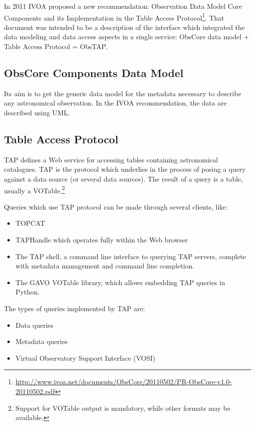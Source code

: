In 2011 IVOA proposed a new recommendation: Observation Data Model Core Components and its Implementation in the Table Access Protocol\footnote{\url{http://www.ivoa.net/documents/ObsCore/20110502/PR-ObsCore-v1.0-20110502.pdf}}. That document was intended to be a description of the interface which integrated the data modeling and data access aspects in a single service: ObsCore data model + Table Access Protocol = ObsTAP.

\subsection{ObsCore Components Data Model}

Its aim is to get the generic data model for the metadata necessary to describe any astronomical observation. In the IVOA recommendation, the data are described using UML.

\subsection{Table Access Protocol}

TAP defines a Web service for accessing tables containing astronomical catalogues. TAP is the protocol which underlies in the process of posing a query against a data source (or several data sources). The result of a query is a table, usually a VOTable.\footnote{Support for VOTable output is mandatory, while other formats may be available.}  

Queries which use TAP protocol can be made through several clients, like:
\begin{itemize}
\item TOPCAT
\item TAPHandle which operates fully within the Web browser
\item The TAP shell, a command line interface to querying TAP servers, complete with metadata management and command line completion.
\item The GAVO VOTable library, which allows embedding TAP queries in Python.
\end{itemize}

The types of queries implemented by TAP are:

\begin{itemize}
\item Data queries
\item Metadata queries
\item Virtual Observatory Support Interface (VOSI)
\end{itemize}


